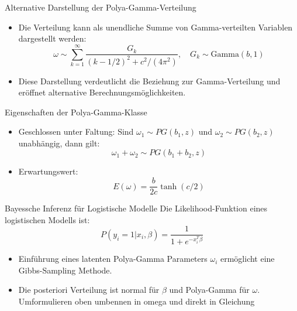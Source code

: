 \documentclass{beamer}
\begin{document}
\begin{frame}{Alternative Darstellung der Polya-Gamma-Verteilung}
	\begin{itemize}
		\item Die Verteilung kann als unendliche Summe von Gamma-verteilten Variablen dargestellt werden:
		\begin{equation}
			\omega \sim \sum_{k=1}^{\infty} \frac{G_k}{(k - 1/2)^2 + c^2/(4  \pi^2)}, \quad G_k \sim \text{Gamma}(b,1)
		\end{equation}
		\item Diese Darstellung verdeutlicht die Beziehung zur Gamma-Verteilung und eröffnet alternative Berechnungsmöglichkeiten.
	\end{itemize}
\end{frame}

	
	\begin{frame}{Eigenschaften der Polya-Gamma-Klasse}
		\begin{itemize}
			\item Geschlossen unter Faltung: Sind $\omega_1 \sim PG(b_1, z)$ und $\omega_2 \sim PG(b_2, z)$ unabhängig, dann gilt:
			\begin{equation}
				\omega_1 + \omega_2 \sim PG(b_1 + b_2, z)
			\end{equation}
			\item Erwartungswert:
			\begin{equation}
				E(\omega) = \frac{b}{2c} \tanh(c/2)
			\end{equation}
		\end{itemize}
	\end{frame}
	
	\begin{frame}{Bayessche Inferenz für Logistische Modelle}
		Die Likelihood-Funktion eines logistischen Modells ist:
		\begin{equation}
			P(y_i = 1 | x_i, \beta) = \frac{1}{1 + e^{-x_i^T \beta}}
		\end{equation}
		\begin{itemize}
			\item Einführung eines latenten Polya-Gamma Parameters $\omega_i$ ermöglicht eine Gibbs-Sampling Methode.
			\item Die posteriori Verteilung ist normal für $\beta$ und Polya-Gamma für $\omega$. Umformulieren oben umbennen in omega und direkt in Gleichung
		\end{itemize}
	\end{frame}
	
\end{document}

